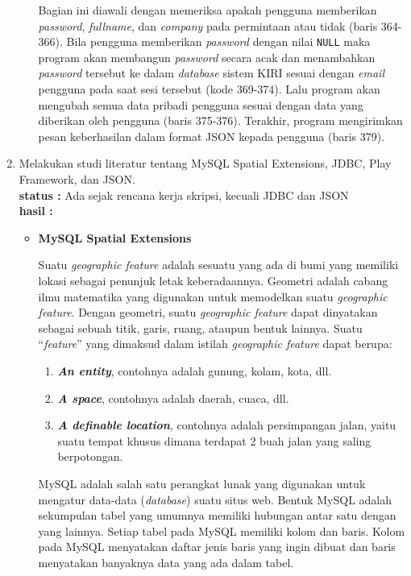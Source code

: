 \documentclass[a4paper,twoside]{article}
\begin{document}
\begin{enumerate}
\begin{itemize}
Bagian ini diawali dengan memeriksa apakah pengguna memberikan \textit{password}, \textit{fullname}, dan \textit{company} pada permintaan atau tidak (baris 364-366). Bila pengguna memberikan \textit{password} dengan nilai \texttt{NULL} maka program akan membangun \textit{password} secara acak dan menambahkan \textit{password} tersebut ke dalam \textit{database} sistem KIRI sesuai dengan \textit{email} pengguna pada saat sesi tersebut (kode 369-374). Lalu program akan mengubah semua data pribadi pengguna sesuai dengan data yang diberikan oleh pengguna (baris 375-376). Terakhir, program mengirimkan pesan keberhasilan dalam format JSON kepada pengguna (baris 379).

\end{itemize}

		
		\item Melakukan studi literatur tentang MySQL Spatial Extensions, JDBC, Play Framework, dan JSON.\\
		{\bf status :} Ada sejak rencana kerja skripsi, kecuali JDBC dan JSON\\
		{\bf hasil :}
		
		\begin{itemize}
			\item \textbf{MySQL Spatial Extensions}

	Suatu \textit{geographic feature}\cite{mysqlspatial} adalah sesuatu yang ada di bumi yang memiliki lokasi sebagai penunjuk letak keberadaannya. Geometri adalah cabang ilmu matematika yang digunakan untuk memodelkan suatu \textit{geographic feature}. Dengan geometri, suatu \textit{geographic feature} dapat dinyatakan sebagai sebuah titik, garis, ruang, ataupun bentuk lainnya. Suatu ``\textit{feature}'' yang dimaksud dalam istilah \textit{geographic feature} dapat berupa:
	\begin{enumerate}
		\item \textbf{\textit{An entity}}, contohnya adalah gunung, kolam, kota, dll.
		\item \textbf{\textit{A space}}, contohnya adalah daerah, cuaca, dll.
		\item \textbf{\textit{A definable location}}, contohnya adalah persimpangan jalan, yaitu suatu tempat khusus dimana terdapat 2 buah jalan yang saling berpotongan.
	\end{enumerate}
	
	MySQL adalah salah satu perangkat lunak yang digunakan untuk mengatur data-data (\textit{database}) suatu situs web. Bentuk MySQL adalah sekumpulan tabel yang umumnya memiliki hubungan antar satu dengan yang lainnya. Setiap tabel pada MySQL memiliki kolom dan baris. Kolom pada MySQL menyatakan daftar jenis baris yang ingin dibuat dan baris menyatakan banyaknya data yang ada dalam tabel.
	

\end{itemize}
\end{enumerate}
\end{document}
